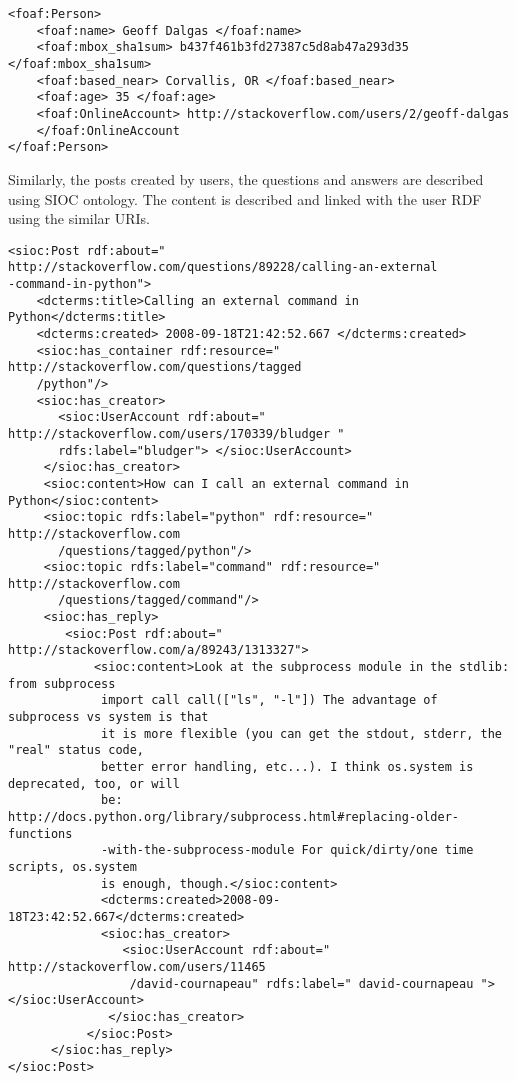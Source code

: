 \begin{verbatim}
<foaf:Person>
    <foaf:name> Geoff Dalgas </foaf:name>
    <foaf:mbox_sha1sum> b437f461b3fd27387c5d8ab47a293d35 </foaf:mbox_sha1sum>
    <foaf:based_near> Corvallis, OR </foaf:based_near>
    <foaf:age> 35 </foaf:age>
    <foaf:OnlineAccount> http://stackoverflow.com/users/2/geoff-dalgas 
    </foaf:OnlineAccount
</foaf:Person>
 \end{verbatim}
 
 Similarly, the posts created by users, the questions and answers are described using SIOC ontology. The content is described and linked with the user RDF using the similar URIs.
 
\begin{verbatim}
<sioc:Post rdf:about=" http://stackoverflow.com/questions/89228/calling-an-external
-command-in-python">
    <dcterms:title>Calling an external command in Python</dcterms:title>
    <dcterms:created> 2008-09-18T21:42:52.667 </dcterms:created>
    <sioc:has_container rdf:resource=" http://stackoverflow.com/questions/tagged
    /python"/>
    <sioc:has_creator>
       <sioc:UserAccount rdf:about=" http://stackoverflow.com/users/170339/bludger " 
       rdfs:label="bludger"> </sioc:UserAccount>
     </sioc:has_creator>
     <sioc:content>How can I call an external command in Python</sioc:content>
     <sioc:topic rdfs:label="python" rdf:resource=" http://stackoverflow.com
       /questions/tagged/python"/>
     <sioc:topic rdfs:label="command" rdf:resource=" http://stackoverflow.com
       /questions/tagged/command"/>
     <sioc:has_reply>
        <sioc:Post rdf:about=" http://stackoverflow.com/a/89243/1313327">
            <sioc:content>Look at the subprocess module in the stdlib: from subprocess 
             import call call(["ls", "-l"]) The advantage of subprocess vs system is that 
             it is more flexible (you can get the stdout, stderr, the "real" status code, 
             better error handling, etc...). I think os.system is deprecated, too, or will
             be: http://docs.python.org/library/subprocess.html#replacing-older-functions
             -with-the-subprocess-module For quick/dirty/one time scripts, os.system
             is enough, though.</sioc:content>
             <dcterms:created>2008-09-18T23:42:52.667</dcterms:created>
             <sioc:has_creator>
                <sioc:UserAccount rdf:about=" http://stackoverflow.com/users/11465
                 /david-cournapeau" rdfs:label=" david-cournapeau "> </sioc:UserAccount>
              </sioc:has_creator>
           </sioc:Post>
      </sioc:has_reply>
</sioc:Post>
\end{verbatim}

